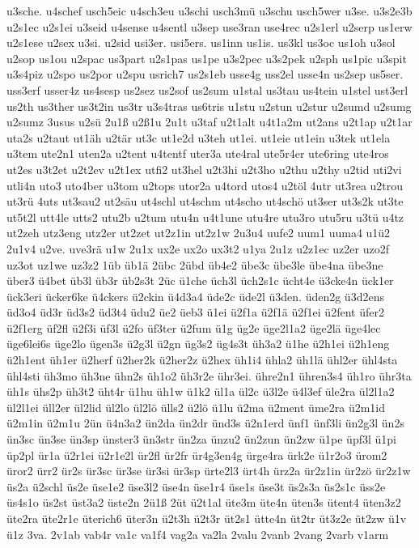{u3sche.
u4schef
usch5eic
u4sch3eu
u3schi
usch3mü
u3schu
usch5wer
u3se.
u3s2e3b
u2s1ec
u2s1ei
u3seid
u4sense
u4sentl
u3sep
use3ran
use4rec
u2s1erl
u2serp
us1erw
u2s1ese
u2sex
u3si.
u2sid
usi3er.
usi5ers.
us1inn
us1is.
us3kl
us3oc
us1oh
u3sol
u2sop
us1ou
u2spac
us3part
u2s1pas
us1pe
u3s2pec
u3s2pek
u2sph
us1pic
u3spit
u3s4piz
u2spo
us2por
u2spu
usrich7
us2s1eb
usse4g
uss2el
usse4n
us2sep
us5ser.
uss3erf
usser4z
us4sesp
us2sez
us2sof
us2sum
u1stal
us3tau
us4tein
u1stel
ust3erl
us2th
us3ther
us3t2in
us3tr
u3s4tras
us6tris
u1stu
u2stun
u2stur
u2sumd
u2sumg
u2sumz
3usus
u2sü
2u1ß
u2ß1u
2u1t
u3taf
u2t1alt
u4t1a2m
ut2ans
u2t1ap
u2t1ar
uta2s
u2taut
ut1äh
u2tär
ut3c
ut1e2d
u3teh
ut1ei.
ut1eie
ut1ein
u3tek
ut1ela
u3tem
ute2n1
uten2a
u2tent
u4tentf
uter3a
ute4ral
ute5r4er
ute6ring
ute4ros
ut2es
u3t2et
u2t2ev
u2t1ex
utfi2
ut3hel
u2t3hi
u2t3ho
u2thu
u2thy
u2tid
uti2vi
utli4n
uto3
uto4ber
u3tom
u2tops
utor2a
u4tord
utos4
u2töl
4utr
ut3rea
u2trou
ut3rü
4uts
ut3sau2
ut2säu
ut4schl
ut4schm
ut4scho
ut4schö
ut3ser
ut3s2k
ut3te
ut5t2l
utt4le
utts2
utu2b
u2tum
utu4n
u4t1une
utu4re
utu3ro
utu5ru
u3tü
u4tz
ut2zeh
utz3eng
utz2er
ut2zet
ut2z1in
ut2z1w
2u3u4
uufe2
uum1
uuma4
u1ü2
2u1v4
u2ve.
uve3rä
u1w
2u1x
ux2e
ux2o
ux3t2
u1ya
2u1z
u2z1ec
uz2er
uzo2f
uz3ot
uz1we
uz3z2
1üb
üb1ä
2übc
2übd
üb4e2
übe3c
übe3le
übe4na
übe3ne
über3
ü4bet
üb3l
üb3r
üb2s3t
2üc
ü1che
üch3l
üch2s1c
ücht4e
ü3cke4n
ück1er
ück3eri
ücker6ke
ü4ckers
ü2ckin
ü4d3a4
üde2c
üde2l
ü3den.
üden2g
ü3d2ens
üd3o4
üd3r
üd3s2
üd3t4
üdu2
üe2
üeb3
ü1ei
ü2f1a
ü2f1ä
ü2f1ei
ü2fent
üfer2
ü2f1erg
üf2fl
ü2f3i
üf3l
ü2fo
üf3ter
ü2fum
ü1g
üg2e
üge2l1a2
üge2lä
üge4lec
üge6lei6s
üge2lo
ügen3s
ü2g3l
ü2gn
üg3s2
üg4s3t
üh3a2
ü1he
ü2h1ei
ü2h1eng
ü2h1ent
üh1er
ü2herf
ü2her2k
ü2her2z
ü2hex
üh1i4
ühla2
üh1lä
ühl2er
ühl4sta
ühl4sti
üh3mo
üh3ne
ühn2s
üh1o2
üh3r2e
ühr3ei.
ühre2n1
ühren3s4
üh1ro
ühr3ta
üh1s
ühs2p
üh3t2
üht4r
ü1hu
üh1w
ü1k2
ül1a
ül2c
ü3l2e
ü4l3ef
üle2ra
ül2l1a2
ül2l1ei
üll2er
ül2lid
ül2lo
ül2lö
ülls2
ü2lö
ü1lu
ü2ma
ü2ment
üme2ra
ü2m1id
ü2m1in
ü2m1u
2ün
ü4n3a2
ün2da
ün2dr
ünd3s
ü2n1erd
ünf1
ünf3li
ün2g3l
ün2s
ün3sc
ün3se
ün3sp
ünster3
ün3str
ün2za
ünzu2
ün2zun
ün2zw
ü1pe
üpf3l
ü1pi
üp2pl
ür1a
ü2r1ei
ü2r1e2l
ür2fl
ür2fr
ür4g3en4g
ürge4ra
ürk2e
ü1r2o3
ürom2
üror2
ürr2
ür2s
ür3sc
ür3se
ür3si
ür3sp
ürte2l3
ürt4h
ürz2a
ür2z1in
ür2zö
ür2z1w
üs2a
ü2schl
üs2e
üse1e2
üse3l2
üse4n
üse1r4
üse1s
üse3t
üs2s3a
üs2s1c
üss2e
üs4s1o
üs2st
üst3a2
üste2n
2ü1ß
2üt
ü2t1al
üte3m
üte4n
üten3s
ütent4
üten3z2
üte2ra
üte2r1e
üterich6
üter3n
ü2t3h
ü2t3r
üt2s1
ütte4n
üt2tr
üt3z2e
üt2zw
ü1v
ü1z
3va.
2v1ab
vab4r
va1c
va1f4
vag2a
va2la
2valu
2vanb
2vang
2varb
v1arm
}
